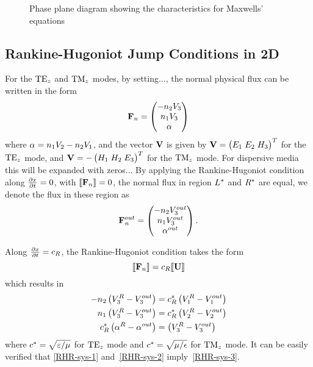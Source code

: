 \begin{figure}[h]
  \centering
  
  \caption{Phase plane diagram showing the characteristics for Maxwells' equations}
  \label{fig:phase-plane-characteristics}
\end{figure}

\subsection{Rankine-Hugoniot Jump Conditions in 2D}
For the $\textrm{TE}_{z}$ and $\textrm{TM}_{z}$ modes, by setting..., the normal physical flux can be
written in the form
$$
\mathbf{F}_n = 
\begin{pmatrix}
  - n_2 V_3 \\
  n_1 V_3 \\
  \alpha
\end{pmatrix}
$$
where $ \alpha = n_1 V_2 - n_2 V_1 $, and the vector $\mathbf{V}$ is given by $
\mathbf{V} = 
  \begin{pmatrix} 
    E_1 \; E_2 \; H_3
  \end{pmatrix}^T
$ for the $\textrm{TE}_{z}$ mode, and $
\mathbf{V} = 
  -
  \begin{pmatrix} 
    H_1 \; H_2 \; E_3
  \end{pmatrix}^T
  $ for the $\textrm{TM}_{z}$ mode.
For dispersive media this will be expanded with zeros...
By applying the Rankine-Hugoniot condition along $\frac{\partial x}{\partial t} = 0$, with $ \llbracket  \mathbf{F}_n  \rrbracket = 0 $, the normal flux in region $L^*$
and $R^*$ are equal, we denote the flux in these region as
$$
\mathbf{F}_n^{out} = 
\begin{pmatrix}
  - n_2 V_3^{out} \\
  n_1 V_3^{out} \\
  \alpha^{out}
\end{pmatrix} .
$$

Along $\frac{\partial x}{\partial t} = c_{R}$, the Rankine-Hugoniot condition takes the form
$$
\llbracket  \mathbf{F}_n  \rrbracket = c_{R} \llbracket  \mathbf{U}  \rrbracket
$$
which results in
\begin{align}
-n_2 \left(V_3^{R} - V_3^{out} \right) &= c^{*}_R \left( V_1^{R} - V_1^{out} \right) \label{RHR-sys-1} \\
n_1 \left(V_3^{R} - V_3^{out} \right) &= c^{*}_R  \left( V_2^{R} - V_2^{out} \right) \label{RHR-sys-2} \\
c^{*}_R \left(\alpha^{R} - \alpha^{out} \right) &= \left( V_3^{R} - V_3^{out} \right) \label{RHR-sys-3}
\end{align}
where $c^{*} = \sqrt{\varepsilon/\mu}$ for $\textrm{TE}_{z}$ mode and $c^{*} =
\sqrt{\mu/\epsilon}$ for $\textrm{TM}_{z}$ mode. It can be easily verified that
\eqref{RHR-sys-1} and~\eqref{RHR-sys-2} imply~\eqref{RHR-sys-3}.

